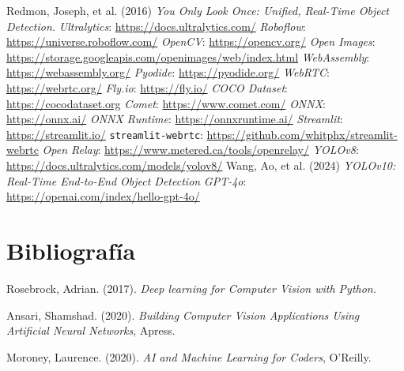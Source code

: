 \documentclass[a4paper]{article}
\begin{document}
\newpage
\onehalfspacing

\setcounter{secnumdepth}{0}
\begin{thebibliography}{999}

 Redmon, Joseph, et al. (2016) \textit{You Only Look Once: Unified, Real-Time Object Detection.}
 \textit{Ultralytics}: \url{https://docs.ultralytics.com/}
 \textit{Roboflow}: \url{https://universe.roboflow.com/}
 \textit{OpenCV}: \url{https://opencv.org/}
 \textit{Open Images}: \url{https://storage.googleapis.com/openimages/web/index.html}
 \textit{WebAssembly}: \url{https://webassembly.org/}
 \textit{Pyodide}: \url{https://pyodide.org/}
 \textit{WebRTC}: \url{https://webrtc.org/}
 \textit{Fly.io}: \url{https://fly.io/}
 \textit{COCO Dataset}: \url{https://cocodataset.org}
 \textit{Comet}: \url{https://www.comet.com/}
 \textit{ONNX}: \url{https://onnx.ai/}
 \textit{ONNX Runtime}: \url{https://onnxruntime.ai/}
 \textit{Streamlit}: \url{https://streamlit.io/}
 \texttt{streamlit-webrtc}: \url{https://github.com/whitphx/streamlit-webrtc}
 \textit{Open Relay}: \url{https://www.metered.ca/tools/openrelay/}
 \textit{YOLOv8}: \url{https://docs.ultralytics.com/models/yolov8/}
 Wang, Ao, et al. (2024) \textit{YOLOv10: Real-Time End-to-End Object Detection}
 \textit{GPT-4o}: \url{https://openai.com/index/hello-gpt-4o/}

\end{thebibliography}

\section{Bibliografía}

Rosebrock, Adrian. (2017). \textit{Deep learning for Computer Vision with Python.}

Ansari, Shamshad. (2020). \textit{Building Computer Vision Applications Using Artificial Neural Networks}, Apress.

Moroney, Laurence. (2020). \textit{AI and Machine Learning for Coders}, O'Reilly.
\end{document}
